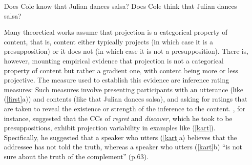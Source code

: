 \documentclass[11pt,fleqn]{article}
\newcommand{\6}{\mbox{$[\hspace*{-.6mm}[$}}
\newcommand{\9}{\mbox{$]\hspace*{-.6mm}]$}}
\begin{document}
\begin{exe}
\ex\label{first} 
\begin{xlist}
\ex Does Cole know that Julian dances salsa?
\ex Does Cole think that Julian dances salsa?
\end{xlist}
\end{exe}

Many theoretical works assume that projection is a categorical property of  content, that is, content either typically projects (in which case it is a presupposition) or it does not (in which case it is not a presupposition). There is, however, mounting empirical evidence that projection is not a categorical property of  content but rather a gradient one, with content being more or less projective. The measure used to establish this evidence are inference rating measures: Such measures involve presenting participants with an utterance (like (\ref{first}a)) and contents (like that Julian dances salsa), and asking for ratings that are taken to reveal the existence or strength of the inference to the content. \citealt{karttunen71b}, for instance, suggested that the CCs of {\em regret} and {\em discover}, which he took to be presuppositions, exhibit projection variability in examples like (\ref{kart}). Specifically, he suggested that a speaker who utters (\ref{kart}a) believes that the addressee has not told the truth, whereas a speaker who utters (\ref{kart}b) ``is not sure about the truth of the complement'' (p.63).
\end{document}
